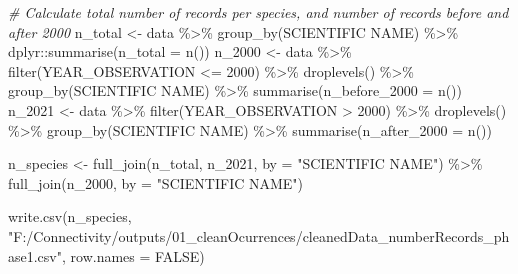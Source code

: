 \documentclass[
]{article}
\newenvironment{Shaded}{\begin{snugshade}}{\end{snugshade}}
\newcommand{\AttributeTok}[1]{\textcolor[rgb]{0.77,0.63,0.00}{#1}}
\newcommand{\CommentTok}[1]{\textcolor[rgb]{0.56,0.35,0.01}{\textit{#1}}}
\newcommand{\ConstantTok}[1]{\textcolor[rgb]{0.00,0.00,0.00}{#1}}
\newcommand{\DecValTok}[1]{\textcolor[rgb]{0.00,0.00,0.81}{#1}}
\newcommand{\FunctionTok}[1]{\textcolor[rgb]{0.00,0.00,0.00}{#1}}
\newcommand{\NormalTok}[1]{#1}
\newcommand{\OtherTok}[1]{\textcolor[rgb]{0.56,0.35,0.01}{#1}}
\newcommand{\SpecialCharTok}[1]{\textcolor[rgb]{0.00,0.00,0.00}{#1}}
\newcommand{\StringTok}[1]{\textcolor[rgb]{0.31,0.60,0.02}{#1}}
\begin{document}
\begin{Shaded}
\begin{Highlighting}[]
\CommentTok{\# Calculate total number of records per species, and number of records before and after 2000}
\NormalTok{n\_total }\OtherTok{\textless{}{-}}\NormalTok{ data }\SpecialCharTok{\%\textgreater{}\%} \FunctionTok{group\_by}\NormalTok{(}\StringTok{\textasciigrave{}}\AttributeTok{SCIENTIFIC NAME}\StringTok{\textasciigrave{}}\NormalTok{) }\SpecialCharTok{\%\textgreater{}\%}\NormalTok{ dplyr}\SpecialCharTok{::}\FunctionTok{summarise}\NormalTok{(}\AttributeTok{n\_total =} \FunctionTok{n}\NormalTok{())}
\NormalTok{n\_2000 }\OtherTok{\textless{}{-}}\NormalTok{ data }\SpecialCharTok{\%\textgreater{}\%} \FunctionTok{filter}\NormalTok{(YEAR\_OBSERVATION }\SpecialCharTok{\textless{}=} \DecValTok{2000}\NormalTok{) }\SpecialCharTok{\%\textgreater{}\%} \FunctionTok{droplevels}\NormalTok{() }\SpecialCharTok{\%\textgreater{}\%} \FunctionTok{group\_by}\NormalTok{(}\StringTok{\textasciigrave{}}\AttributeTok{SCIENTIFIC NAME}\StringTok{\textasciigrave{}}\NormalTok{) }\SpecialCharTok{\%\textgreater{}\%} \FunctionTok{summarise}\NormalTok{(}\AttributeTok{n\_before\_2000 =} \FunctionTok{n}\NormalTok{())}
\NormalTok{n\_2021 }\OtherTok{\textless{}{-}}\NormalTok{ data }\SpecialCharTok{\%\textgreater{}\%} \FunctionTok{filter}\NormalTok{(YEAR\_OBSERVATION }\SpecialCharTok{\textgreater{}} \DecValTok{2000}\NormalTok{) }\SpecialCharTok{\%\textgreater{}\%} \FunctionTok{droplevels}\NormalTok{() }\SpecialCharTok{\%\textgreater{}\%} \FunctionTok{group\_by}\NormalTok{(}\StringTok{\textasciigrave{}}\AttributeTok{SCIENTIFIC NAME}\StringTok{\textasciigrave{}}\NormalTok{) }\SpecialCharTok{\%\textgreater{}\%} \FunctionTok{summarise}\NormalTok{(}\AttributeTok{n\_after\_2000 =} \FunctionTok{n}\NormalTok{())}

\NormalTok{n\_species }\OtherTok{\textless{}{-}} \FunctionTok{full\_join}\NormalTok{(n\_total, n\_2021, }\AttributeTok{by =} \StringTok{"SCIENTIFIC NAME"}\NormalTok{) }\SpecialCharTok{\%\textgreater{}\%} \FunctionTok{full\_join}\NormalTok{(n\_2000, }\AttributeTok{by =} \StringTok{"SCIENTIFIC NAME"}\NormalTok{) }

\FunctionTok{write.csv}\NormalTok{(n\_species, }\StringTok{"F:/Connectivity/outputs/01\_cleanOcurrences/cleanedData\_numberRecords\_phase1.csv"}\NormalTok{, }\AttributeTok{row.names =} \ConstantTok{FALSE}\NormalTok{)}
\end{Highlighting}
\end{Shaded}
\end{document}
